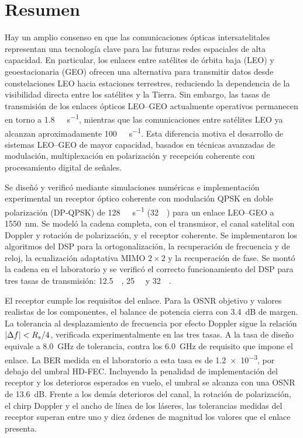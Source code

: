 

\chapter*{Resumen}

Hay un amplio consenso en que las comunicaciones \'opticas intersatelitales
representan una tecnolog\'ia clave para las futuras redes espaciales de alta
capacidad. En particular, los enlaces entre sat\'elites de \'orbita baja (LEO)
y geoestacionaria (GEO) ofrecen una alternativa para transmitir datos desde
constelaciones LEO hacia estaciones terrestres, reduciendo la dependencia de la
visibilidad directa entre los sat\'elites y la Tierra. Sin embargo, las tasas
de transmisi\'on de los enlaces \'opticos LEO--GEO actualmente operativos
permanecen en torno a \SI{1.8}{\giga\bit\per\second}, mientras que las
comunicaciones entre sat\'elites LEO ya alcanzan aproximadamente
\SI{100}{\giga\bit\per\second}. Esta diferencia motiva el desarrollo de
sistemas LEO--GEO de mayor capacidad, basados en t\'ecnicas avanzadas de
modulaci\'on, multiplexaci\'on en polarizaci\'on y recepci\'on coherente con
procesamiento digital de se\~nales.

Se diseñ\'o y verific\'o mediante simulaciones numéricas e implementación experimental un receptor \'optico
coherente con modulaci\'on QPSK en doble polarizaci\'on (DP-QPSK) de \SI{128}{\giga\bit\per\second} (\SI{32}{\giga\baud}) para un enlace LEO--GEO a
\SI{1550}{\nano\metre}. Se model\'o la cadena completa, con el transmisor, el
canal satelital con Doppler y rotaci\'on de polarizaci\'on, y el receptor
coherente. Se implementaron los algoritmos del DSP para la
ortogonalizaci\'on, la recuperaci\'on de frecuencia y de reloj, la ecualizaci\'on
adaptativa MIMO $2\times2$ y la recuperaci\'on de fase.
Se mont\'o la cadena en el laboratorio y se verific\'o el correcto
funcionamiento del DSP para tres tasas de transmisi\'on:
\SI{12.5}{\giga\baud}, \SI{25}{\giga\baud} y \SI{32}{\giga\baud}.

El receptor cumple los requisitos del enlace. Para la OSNR objetivo y valores
realistas de los componentes, el balance de potencia cierra con \SI{3.4}{\dB}
de margen. La tolerancia al desplazamiento de frecuencia por efecto Doppler
sigue la relaci\'on $\left\lvert \Delta f \right\rvert < R_{s}/4$, verificada experimentalmente en las tres
tasas. A la tasa de dise\~no equivale a \SI{8.0}{\giga\hertz} de tolerancia, contra los 
\SI{6.0}{\giga\hertz} de requisito que impone el enlace. La BER medida en el laboratorio a
esta tasa es de \num{1.2e-3}, por debajo del umbral HD-FEC. Incluyendo la
penalidad de implementaci\'on del receptor y los deterioros esperados en vuelo,
el umbral se alcanza con una OSNR de \SI{13.6}{\dB}. Frente a los dem\'as
deterioros del canal, la rotaci\'on de polarizaci\'on, el chirp Doppler y el
ancho de l\'inea de los l\'aseres, las tolerancias medidas del receptor superan
entre uno y diez \'ordenes de magnitud los valores que el enlace presenta.

